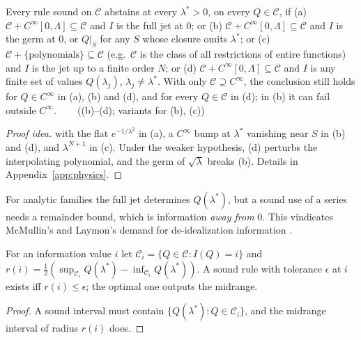 \begin{theorem}\label{thm:physics:nofree}
Every rule sound on $\mathcal C$ abstains at every $\lambda^*>0$, on every $Q\in\mathcal C$,
if (a) $\mathcal C+C^\infty[0,\Lambda]\subseteq\mathcal C$ and $I$ is the full jet at $0$;
or (b) $\mathcal C+C^\infty[0,\Lambda]\subseteq\mathcal C$ and $I$ is the germ at $0$, or
$Q|_S$ for any $S$ whose closure omits $\lambda^*$; or (c) $\mathcal C+\{\text{polynomials}\}\subseteq\mathcal C$
(e.g.\ $\mathcal C$ is the class of all restrictions of entire functions) and $I$ is the
jet up to a finite order $N$; or (d) $\mathcal C+C^\infty[0,\Lambda]\subseteq\mathcal C$ and
$I$ is any finite set of values $Q(\lambda_j)$, $\lambda_j\neq\lambda^*$. With only
$\mathcal C\supseteq C^\infty$, the conclusion still holds for $Q\in C^\infty$ in (a), (b)
and (d), and for every $Q\in\mathcal C$ in (d); in (b) it can fail outside $C^\infty$.
\hfill{}\ \ \  ((b)--(d); variants for (b), (c))
\end{theorem}
\begin{proof}[Proof idea]
 with the flat $e^{-1/\lambda^2}$ in (a), a $C^\infty$ bump at
$\lambda^*$ vanishing near $S$ in (b) and (d), and $\lambda^{N+1}$ in (c). Under the weaker
hypothesis, (d) perturbs the interpolating polynomial, and the germ of $\sqrt\lambda$ breaks
(b). Details in Appendix~\ref{app:physics}.
\end{proof}

For analytic families the full jet determines $Q(\lambda^*)$, but a sound use of a series
needs a remainder bound, which is information \emph{away from} $0$. This vindicates McMullin's and Laymon's demand for de-idealization information
\citep{mcmullin1985galilean,laymon1987scott}.

\begin{proposition}\label{prop:physics:radius}
For an information value $i$ let $\mathcal C_i=\{Q\in\mathcal C:I(Q)=i\}$ and
$r(i)=\frac12(\sup_{\mathcal C_i}Q(\lambda^*)-\inf_{\mathcal C_i}Q(\lambda^*))$. A sound rule
with tolerance $\epsilon$ at $i$ exists iff $r(i)\le\epsilon$; the optimal one outputs the
midrange.
\hfill{}
\end{proposition}
\begin{proof}
A sound interval must contain $\{Q(\lambda^*):Q\in\mathcal C_i\}$, and the midrange interval
of radius $r(i)$ does.
\end{proof}

